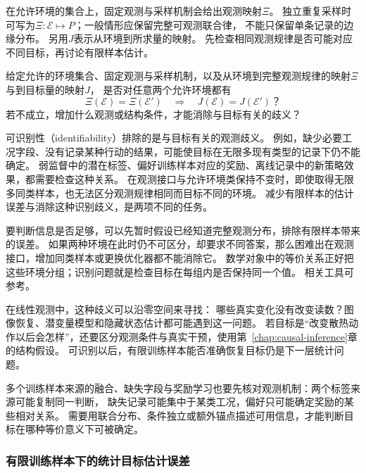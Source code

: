 在允许环境的集合上，固定观测与采样机制会给出观测映射$\Xi$。
独立重复采样时可写为$\Xi:\mathcal E\mapsto P$；一般情形应保留完整可观测联合律，
不能只保留单条记录的边缘分布。
另用$J$表示从环境到所求量的映射。
先检查相同观测规律是否可能对应不同目标，再讨论有限样本估计。

\begin{mathproblem}[可观测规律是否确定所求量]
  \label{question:future-identification}
  给定允许的环境集合、固定观测与采样机制，以及从环境到完整观测规律的映射$\Xi$
  与到目标量的映射$J$，
  是否对任意两个允许环境都有
  \[
    \Xi(\mathcal E)=\Xi(\mathcal E')
    \quad\Longrightarrow\quad
    J(\mathcal E)=J(\mathcal E')\text{？}
  \]
  若不成立，增加什么观测或结构条件，才能消除与目标有关的歧义？
\end{mathproblem}

可识别性（identifiability）排除的是与目标有关的观测歧义。
例如，缺少必要工况字段、没有记录某种行动的结果，可能使目标在无限多现有类型的记录下仍不能确定。
弱监督中的潜在标签、偏好训练样本对应的奖励、离线记录中的新策略效果，都需要检查这种关系。
在观测接口与允许环境类保持不变时，即使取得无限多同类样本，也无法区分观测规律相同而目标不同的环境。
减少有限样本的估计误差与消除这种识别歧义，是两项不同的任务。

要判断信息是否足够，可以先暂时假设已经知道完整观测分布，排除有限样本带来的误差。
如果两种环境在此时仍不可区分，却要求不同答案，那么困难出在观测接口，增加同类样本或更换优化器都不能消除它。
数学对象中的等价关系正好把这些环境分组；识别问题就是检查目标在每组内是否保持同一个值。
相关工具可参考。

在线性观测中，这种歧义可以沿零空间来寻找：
哪些真实变化没有改变读数？图像恢复、潜变量模型和隐藏状态估计都可能遇到这一问题。
若目标是“改变散热动作以后会怎样”，还要区分观测条件与真实干预，使用第~\ref{chap:causal-inference}章的结构假设。
可识别以后，有限训练样本能否准确恢复目标仍是下一层统计问题。

多个训练样本来源的融合、缺失字段与奖励学习也要先核对观测机制：两个标签来源可能复制同一判断，
缺失记录可能集中于某类工况，偏好只可能确定奖励的某些相对关系。
需要用联合分布、条件独立或额外锚点描述可用信息，才能判断目标在哪种等价意义下可被确定。

\subsubsection{有限训练样本下的统计目标估计误差}
\label{sec:future-analysis-generalization}

